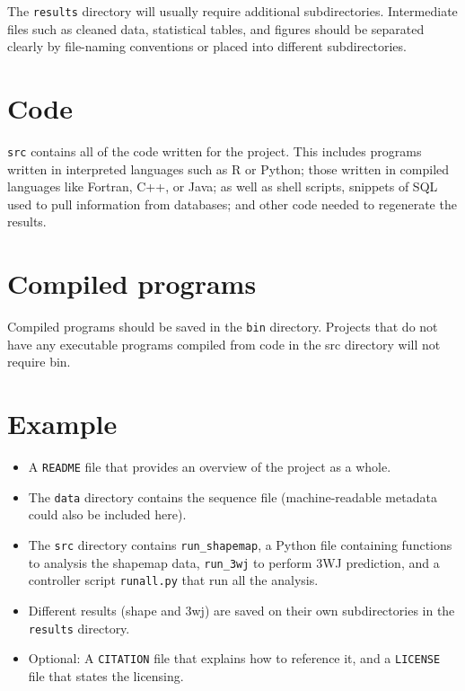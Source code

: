 \documentclass[
]{book}
\providecommand{\tightlist}{%
  \setlength{\itemsep}{0pt}\setlength{\parskip}{0pt}}
\begin{document}
The \texttt{results} directory will usually require additional subdirectories. Intermediate files such as cleaned data, statistical tables, and figures should be separated clearly by file-naming conventions or placed into different subdirectories.

\hypertarget{code}{%
\section{Code}\label{code}}

\texttt{src} contains all of the code written for the project. This includes programs
written in interpreted languages such as R or Python; those written in compiled
languages like Fortran, C++, or Java; as well as shell scripts, snippets of SQL
used to pull information from databases; and other code needed to regenerate the
results.

\hypertarget{compiled-programs}{%
\section{Compiled programs}\label{compiled-programs}}

Compiled programs should be saved in the \texttt{bin} directory. Projects that do not
have any executable programs compiled from code in the src directory will not
require bin.

\hypertarget{example}{%
\section{Example}\label{example}}

\begin{itemize}
\tightlist
\item
  A \texttt{README} file that provides an overview of the project as a whole.
\item
  The \texttt{data} directory contains the sequence file (machine-readable metadata
  could also be included here).
\item
  The \texttt{src} directory contains \texttt{run\_shapemap}, a Python file containing
  functions to analysis the shapemap data, \texttt{run\_3wj} to perform 3WJ prediction,
  and a controller script \texttt{runall.py} that run all the analysis.
\item
  Different results (shape and 3wj) are saved on their own subdirectories
  in the \texttt{results} directory.
\item
  Optional: A \texttt{CITATION} file that explains how to reference it, and a \texttt{LICENSE} file that states the licensing.
\end{itemize}
\end{document}
